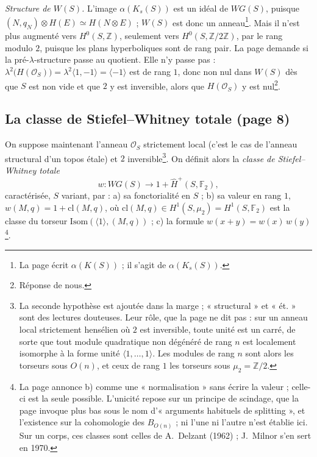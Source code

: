 \documentclass[11pt,a4paper]{article}
\begin{document}
\emph{Structure de $W(S)$.} L'image $\alpha(K_s(S))$ est un idéal de
$WG(S)$, puisque $(N, q_N) \otimes H(E) \simeq H(N \otimes E)$ ; $W(S)$ est
donc un anneau\footnote{La page écrit $\alpha(K(S))$ ; il s'agit de
$\alpha(K_s(S))$.}. Mais il n'est plus augmenté vers $H^{0}(S,
\mathbb{Z})$, seulement vers $H^{0}(S, \mathbb{Z}/2\mathbb{Z})$, par le rang
modulo $2$, puisque les plans hyperboliques sont de rang pair. La page
demande si la pré-$\lambda$-structure passe au quotient. Elle n'y passe
pas : $\lambda^{2}\bigl(H(\mathcal{O}_S)\bigr) = \lambda^{2}\langle 1, -1
\rangle = \langle -1 \rangle$ est de rang $1$, donc non nul dans $W(S)$ dès
que $S$ est non vide et que $2$ y est inversible, alors que $H(\mathcal{O}_S)$
y est nul\footnote{Réponse de nous.}.

\subsection*{La classe de Stiefel–Whitney totale (page 8)}

On suppose maintenant l'anneau $\mathcal{O}_S$ strictement local (c'est le
cas de l'anneau structural d'un topos étale) et $2$ inversible\footnote{La
seconde hypothèse est ajoutée dans la marge ; « structural » et « ét. »
sont des lectures douteuses. Leur rôle, que la page ne dit pas : sur un
anneau local strictement hensélien où $2$ est inversible, toute unité est un
carré, de sorte que tout module quadratique non dégénéré de rang $n$ est
localement isomorphe à la forme unité $\langle 1, \dots, 1 \rangle$. Les
modules de rang $n$ sont alors les torseurs sous $O(n)$, et ceux de rang $1$
les torseurs sous $\mu_2 = \mathbb{Z}/2$.}. On définit alors la
\emph{classe de Stiefel–Whitney totale}
\[
w \colon WG(S) \longrightarrow 1 + \widehat{H}^{+}(S, \mathbb{F}_2),
\]
caractérisée, $S$ variant, par : a) sa fonctorialité en $S$ ; b) sa valeur
en rang $1$, $w(M, q) = 1 + \mathrm{cl}(M, q)$, où
$\mathrm{cl}(M, q) \in H^{1}(S, \mu_2) = H^{1}(S, \mathbb{F}_2)$ est la
classe du torseur $\mathrm{Isom}(\langle 1 \rangle, (M, q))$ ; c) la formule
$w(x + y) = w(x)\,w(y)$\footnote{La page annonce b) comme une
« normalisation » sans écrire la valeur ; celle-ci est la seule possible.
L'unicité repose sur un principe de scindage, que la page invoque plus bas
sous le nom d'« arguments habituels de splitting », et l'existence sur la
cohomologie des $B_{O(n)}$ ; ni l'une ni l'autre n'est établie ici. Sur un
corps, ces classes sont celles de A.~Delzant (1962) ; J.~Milnor s'en sert en
1970.}.
\end{document}
